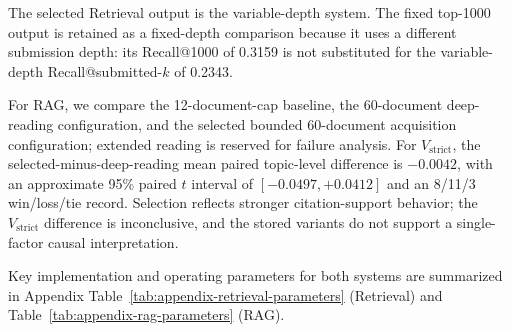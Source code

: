 The selected Retrieval output is the variable-depth system. The fixed
top-1000 output is retained as a fixed-depth comparison because it uses a
different submission depth: its Recall@1000 of 0.3159 is not substituted
for the variable-depth Recall@submitted-$k$ of 0.2343.

For RAG, we compare the 12-document-cap baseline, the 60-document
deep-reading configuration, and the selected bounded 60-document
acquisition configuration; extended reading is reserved for failure
analysis. For $V_{\mathrm{strict}}$, the selected-minus-deep-reading
mean paired topic-level difference is $-0.0042$, with an approximate
95\% paired $t$ interval of $[-0.0497,+0.0412]$ and an 8/11/3
win/loss/tie record. Selection reflects stronger citation-support
behavior; the $V_{\mathrm{strict}}$ difference is inconclusive, and the stored
variants do not support a single-factor causal interpretation.

Key implementation and operating parameters for both systems are summarized in Appendix
Table~\ref{tab:appendix-retrieval-parameters} (Retrieval) and
Table~\ref{tab:appendix-rag-parameters} (RAG).
